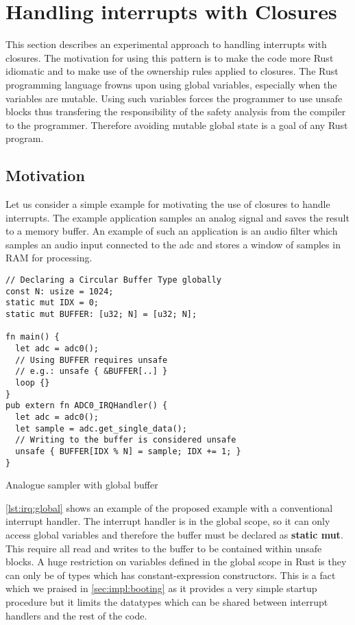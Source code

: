 \section{Handling interrupts with Closures}
\label{sec:irq-closures}

This section describes an experimental approach to handling interrupts with closures.
The motivation for using this pattern is to make the code more Rust idiomatic and to make use of the ownership rules applied to closures.
The Rust programming language frowns upon using global variables, especially when the variables are mutable.
Using such variables forces the programmer to use unsafe blocks thus transfering the responsibility of the safety analysis from the compiler to the programmer.
Therefore avoiding mutable global state is a goal of any Rust program.

\subsection{Motivation}
\label{sec:irq:motivation}

Let us consider a simple example for motivating the use of closures to handle interrupts.
The example application samples an analog signal and saves the result to a memory buffer.
An example of such an application is an audio filter which samples an audio input connected to the \gls{adc} and stores a window of samples in RAM for processing.

\begin{listing}[H]
  \begin{verbatim}
// Declaring a Circular Buffer Type globally
const N: usize = 1024;
static mut IDX = 0;
static mut BUFFER: [u32; N] = [u32; N];

fn main() {
  let adc = adc0();
  // Using BUFFER requires unsafe
  // e.g.: unsafe { &BUFFER[..] }
  loop {}
}
pub extern fn ADC0_IRQHandler() {
  let adc = adc0();
  let sample = adc.get_single_data();
  // Writing to the buffer is considered unsafe
  unsafe { BUFFER[IDX % N] = sample; IDX += 1; }
}
  \end{verbatim}
  \caption{Analogue sampler with global buffer}
  \label{lst:irq:global}
\end{listing}

\autoref{lst:irq:global} shows an example of the proposed example with a conventional interrupt handler.
The interrupt handler is in the global scope, so it can only access global variables and therefore the buffer must be declared as \textbf{static mut}.
This require all read and writes to the buffer to be contained within unsafe blocks.
A huge restriction on variables defined in the global scope in Rust is they can only be of types which has constant-expression constructors.
This is a fact which we praised in \autoref{sec:impl:booting} as it provides a very simple startup procedure but it limits the datatypes which can be shared between interrupt handlers and the rest of the code.

